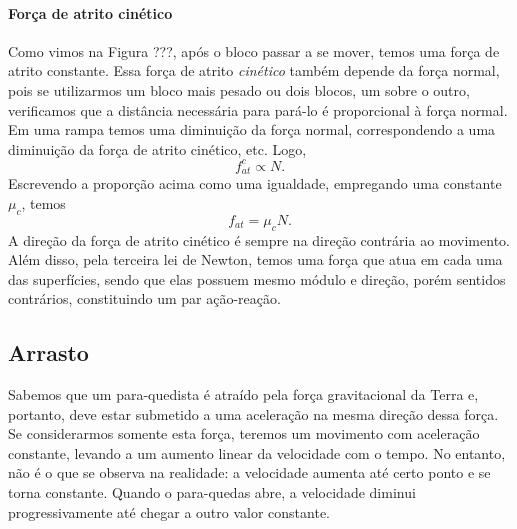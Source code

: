 \paragraph{Força de atrito cinético} 

Como vimos na Figura ???, após o bloco passar a se mover, temos uma força de atrito constante. Essa força de atrito \emph{cinético} também depende da força normal, pois se utilizarmos um bloco mais pesado ou dois blocos, um sobre o outro, verificamos que a distância necessária para pará-lo é proporcional à força normal. Em uma rampa temos uma diminuição da força normal, correspondendo a uma diminuição da força de atrito cinético, etc. Logo,
\begin{equation}
  f_{at}^c \propto N.
\end{equation}
%
Escrevendo a proporção acima como uma igualdade, empregando uma constante $\mu_c$, temos
\begin{equation}
  f_{at} = \mu_c N.
\end{equation}
%
A direção da força de atrito cinético é sempre na direção contrária ao movimento. Além disso, pela terceira lei de Newton, temos uma força que atua em cada uma das superfícies, sendo que elas possuem mesmo módulo e direção, porém sentidos contrários, constituindo um par ação-reação.

\subsection{Arrasto}

Sabemos que um para-quedista é atraído pela força gravitacional da Terra e, portanto, deve estar submetido a uma aceleração na mesma direção dessa força. Se considerarmos somente esta força, teremos um movimento com aceleração constante, levando a um aumento linear da velocidade com o tempo. No entanto, não é o que se observa na realidade: a velocidade aumenta até certo ponto e se torna constante. Quando o para-quedas abre, a velocidade diminui progressivamente até chegar a outro valor constante.

